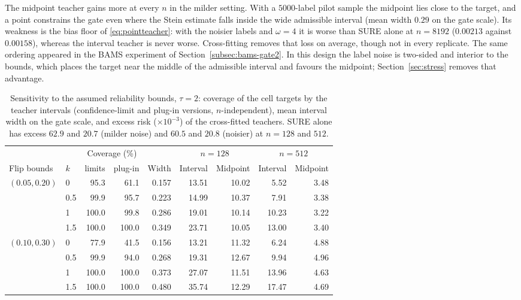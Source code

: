 \documentclass[11pt]{article}
\theoremstyle{plain}
\theoremstyle{definition}
\theoremstyle{remark}
\begin{document}
The midpoint teacher gains more at every $n$ in the milder setting. With a $5000$-label pilot sample the midpoint lies close to the target, and a
point constrains the gate even where the Stein estimate falls inside the wide admissible interval
(mean width $0.29$ on the gate scale). Its weakness is the bias floor of
\eqref{eq:pointteacher}: with the noisier labels and $\omega=4$ it is worse than SURE alone at
$n=8192$ ($0.00213$ against $0.00158$), whereas the interval teacher is never worse.
Cross-fitting removes that loss on average, though not in every replicate. The same ordering
appeared in the BAMS experiment of Section~\ref{subsec:bams-gate2}. In this design the label
noise is two-sided and interior to the bounds, which places the target near the middle of the
admissible interval and favours the midpoint; Section~\ref{sec:stress} removes that advantage.

\begin{table}[htbp]
\centering\small
\caption{Sensitivity to the assumed reliability bounds, $\tau=2$: coverage of the cell
targets by the teacher intervals (confidence-limit and plug-in versions, $n$-independent),
mean interval width on the gate scale, and excess risk ($\times10^{-3}$) of the cross-fitted
teachers. SURE alone has excess $62.9$ and $20.7$ (milder noise) and $60.5$ and $20.8$
(noisier) at $n=128$ and $512$.}
\label{tab:sim7k}
\begin{tabular}{llrrrrrrr}
\toprule
& & \multicolumn{2}{c}{Coverage (\%)} & & \multicolumn{2}{c}{$n=128$} & \multicolumn{2}{c}{$n=512$}\\
\cmidrule(lr){3-4}\cmidrule(lr){6-7}\cmidrule(lr){8-9}
Flip bounds & $k$ & limits & plug-in & Width & Interval & Midpoint & Interval & Midpoint\\
\midrule
$(0.05,0.20)$ & 0 & 95.3 & 61.1 & 0.157 & 13.51 & 10.02 & 5.52 & 3.48\\
 & 0.5 & 99.9 & 95.7 & 0.223 & 14.99 & 10.37 & 7.91 & 3.38\\
 & 1 & 100.0 & 99.8 & 0.286 & 19.01 & 10.14 & 10.23 & 3.22\\
 & 1.5 & 100.0 & 100.0 & 0.349 & 23.71 & 10.05 & 13.00 & 3.40\\
\addlinespace
$(0.10,0.30)$ & 0 & 77.9 & 41.5 & 0.156 & 13.21 & 11.32 & 6.24 & 4.88\\
 & 0.5 & 99.9 & 94.0 & 0.268 & 19.31 & 12.67 & 9.94 & 4.96\\
 & 1 & 100.0 & 100.0 & 0.373 & 27.07 & 11.51 & 13.96 & 4.63\\
 & 1.5 & 100.0 & 100.0 & 0.480 & 35.74 & 12.29 & 17.47 & 4.69\\
\bottomrule
\end{tabular}
\end{table}
\end{document}
